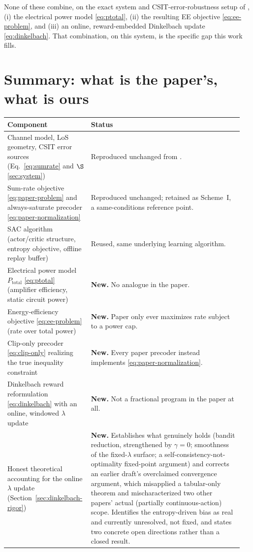\documentclass[11pt]{article}
\begin{document}
None of these combine, on the exact system and CSIT-error-robustness setup
of \cite{Schroder2025}, (i) the electrical power model \eqref{eq:ptotal},
(ii) the resulting EE objective \eqref{eq:ee-problem}, and (iii) an
online, reward-embedded Dinkelbach update \eqref{eq:dinkelbach}. That
combination, on this system, is the specific gap this work fills.

\section{Summary: what is the paper's, what is ours}

\begin{center}
\begin{tabular}{@{}p{0.32\linewidth}p{0.63\linewidth}@{}}
\toprule
\textbf{Component} & \textbf{Status} \\
\midrule
Channel model, LoS geometry, CSIT error sources (Eq.~\ref{eq:sumrate} and
$\S$\ref{sec:system}) & Reproduced unchanged from \cite{Schroder2025}. \\
Sum-rate objective \eqref{eq:paper-problem} and always-saturate precoder
\eqref{eq:paper-normalization} & Reproduced unchanged; retained as Scheme~I,
a same-conditions reference point. \\
SAC algorithm (actor/critic structure, entropy objective, offline replay
buffer) & Reused, same underlying learning algorithm. \\
Electrical power model $P_{\text{total}}$ \eqref{eq:ptotal} (amplifier
efficiency, static circuit power) & \textbf{New.} No analogue in the paper. \\
Energy-efficiency objective \eqref{eq:ee-problem} (rate over total power) &
\textbf{New.} Paper only ever maximizes rate subject to a power cap. \\
Clip-only precoder \eqref{eq:clip-only} realizing the true inequality
constraint & \textbf{New.} Every paper precoder instead implements
\eqref{eq:paper-normalization}. \\
Dinkelbach reward reformulation \eqref{eq:dinkelbach} with an online,
windowed $\lambda$ update & \textbf{New.} Not a fractional program in the
paper at all. \\
Honest theoretical accounting for the online $\lambda$ update
(Section~\ref{sec:dinkelbach-rigor}) & \textbf{New.} Establishes what
genuinely holds (bandit reduction, strengthened by $\gamma=0$; smoothness of
the fixed-$\lambda$ surface; a self-consistency-not-optimality fixed-point
argument) and corrects an earlier draft's overclaimed convergence argument,
which misapplied a tabular-only theorem and mischaracterized two other
papers' actual (partially continuous-action) scope. Identifies the
entropy-driven bias as real and currently unresolved, not fixed, and states
two concrete open directions rather than a closed result. \\
\bottomrule
\end{tabular}
\end{center}
\end{document}
